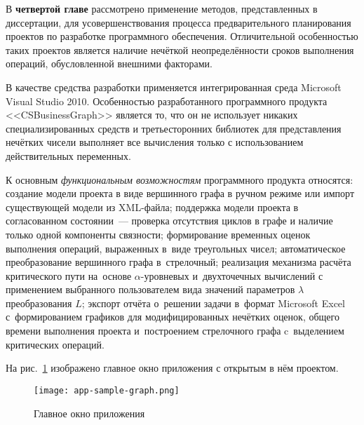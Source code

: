 В \textbf{четвертой главе} рассмотрено применение методов, представленных в диссертации, для усовершенствования процесса предварительного планирования проектов по разработке программного обеспечения. Отличительной особенностью таких проектов является наличие нечёткой неопределённости сроков выполнения операций, обусловленной внешними факторами. 

В качестве средства разработки применяется интегрированная среда Microsoft Visual Studio 2010. Особенностью разработанного программного продукта <<CSBusinessGraph>> является то, что он не использует никаких специализированных средств и третьесторонних библиотек для представления нечётких чисели выполняет все вычисления только с использованием действительных переменных.

К основным \textit{функциональным возможностям} программного продукта относятся: создание модели проекта в виде вершинного графа в ручном режиме или импорт существующей модели из XML-файла; поддержка модели проекта в согласованном состоянии~--- проверка отсутствия циклов в графе и наличие только одной компоненты связности; формирование временных оценок выполнения операций, выраженных в~виде треугольных чисел; автоматическое преобразование вершинного графа в~стрелочный; реализация механизма расчёта критического пути на~основе $\alpha$-уровневых и~двухточечных вычислений с применением выбранного пользователем  вида значений параметров $\lambda$ преобразования $L$; экспорт отчёта о~решении задачи в~формат Microsoft Excel с~формированием графиков для модифицированных нечётких оценок, общего времени выполнения проекта и~построением стрелочного графа c~выделением критических операций.

На рис.~\ref{fig:app-sample-graph} изображено главное окно приложения с открытым в нём проектом.
\begin{figure}[t!] 
  \center
  \texttt{[image: app-sample-graph.png]}
  \caption{Главное окно приложения} 
  \label{fig:app-sample-graph}
\end{figure}
